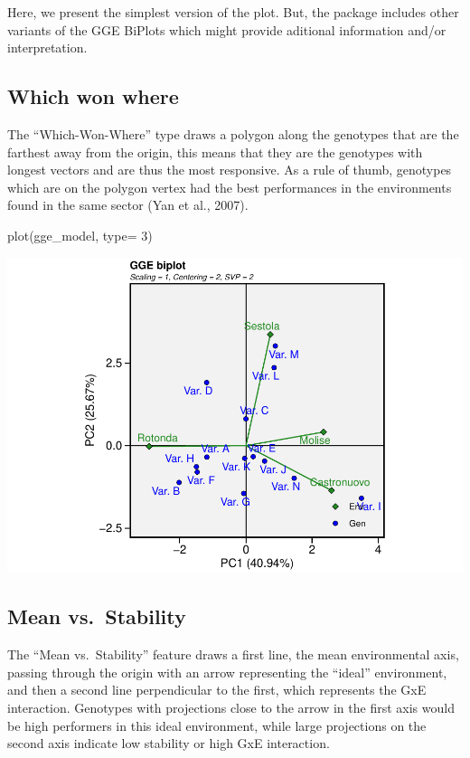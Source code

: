 \documentclass[
]{book}
\newenvironment{Shaded}{\begin{snugshade}}{\end{snugshade}}
\newcommand{\AttributeTok}[1]{\textcolor[rgb]{0.77,0.63,0.00}{#1}}
\newcommand{\DecValTok}[1]{\textcolor[rgb]{0.00,0.00,0.81}{#1}}
\newcommand{\FunctionTok}[1]{\textcolor[rgb]{0.00,0.00,0.00}{#1}}
\newcommand{\NormalTok}[1]{#1}
\begin{document}
Here, we present the simplest version of the plot. But, the package includes other variants of the GGE BiPlots which might provide aditional information and/or interpretation.

\hypertarget{which-won-where}{%
\subsection{Which won where}\label{which-won-where}}

The ``Which-Won-Where'' type draws a polygon along the genotypes that are the farthest away from the origin, this means that they are the genotypes with longest vectors and are thus the most responsive. As a rule of thumb,
genotypes which are on the polygon vertex had the best performances in the environments found in the same sector (Yan et al., 2007).

\begin{Shaded}
\begin{Highlighting}[]
\FunctionTok{plot}\NormalTok{(gge\_model, }\AttributeTok{type=} \DecValTok{3}\NormalTok{)}
\end{Highlighting}
\end{Shaded}

\includegraphics{PPB-Toolkit-for-R-and-R-Studio_files/figure-latex/unnamed-chunk-127-1.pdf}

\hypertarget{mean-vs.-stability}{%
\subsection{Mean vs.~Stability}\label{mean-vs.-stability}}

The ``Mean vs.~Stability'' feature draws a first line, the mean environmental axis, passing through the origin with an arrow representing the ``ideal'' environment, and then a second line perpendicular to the first, which represents the GxE interaction. Genotypes with projections close to the arrow in the first axis would be high performers in this ideal environment, while large projections on the second axis indicate low stability or high GxE interaction.
\end{document}
